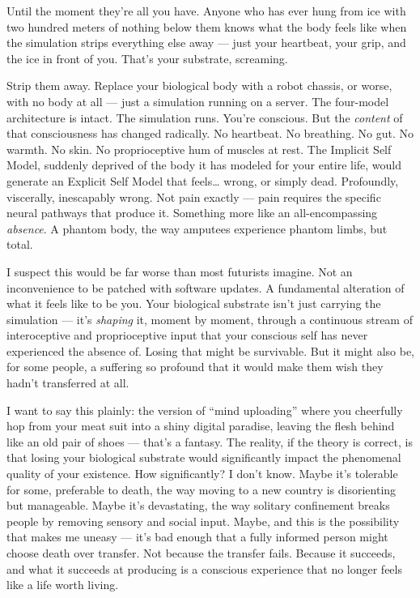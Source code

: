 \documentclass[11pt, twoside, openright]{book}
\begin{document}
Until the moment they're all you have. Anyone who has ever hung from ice with two hundred meters of nothing below them knows what the body feels like when the simulation strips everything else away --- just your heartbeat, your grip, and the ice in front of you. That's your substrate, screaming.

Strip them away. Replace your biological body with a robot chassis, or worse, with no body at all --- just a simulation running on a server. The four-model architecture is intact. The simulation runs. You're conscious. But the \textit{content} of that consciousness has changed radically. No heartbeat. No breathing. No gut. No warmth. No skin. No proprioceptive hum of muscles at rest. The Implicit Self Model, suddenly deprived of the body it has modeled for your entire life, would generate an Explicit Self Model that feels\ldots{} wrong, or simply dead. Profoundly, viscerally, inescapably wrong. Not pain exactly --- pain requires the specific neural pathways that produce it. Something more like an all-encompassing \textit{absence}. A phantom body, the way amputees experience phantom limbs, but total.

I suspect this would be far worse than most futurists imagine. Not an inconvenience to be patched with software updates. A fundamental alteration of what it feels like to be you. Your biological substrate isn't just carrying the simulation --- it's \textit{shaping} it, moment by moment, through a continuous stream of interoceptive and proprioceptive input that your conscious self has never experienced the absence of. Losing that might be survivable. But it might also be, for some people, a suffering so profound that it would make them wish they hadn't transferred at all.

I want to say this plainly: the version of ``mind uploading'' where you cheerfully hop from your meat suit into a shiny digital paradise, leaving the flesh behind like an old pair of shoes --- that's a fantasy. The reality, if the theory is correct, is that losing your biological substrate would significantly impact the phenomenal quality of your existence. How significantly? I don't know. Maybe it's tolerable for some, preferable to death, the way moving to a new country is disorienting but manageable. Maybe it's devastating, the way solitary confinement breaks people by removing sensory and social input. Maybe, and this is the possibility that makes me uneasy --- it's bad enough that a fully informed person might choose death over transfer. Not because the transfer fails. Because it succeeds, and what it succeeds at producing is a conscious experience that no longer feels like a life worth living.
\end{document}
